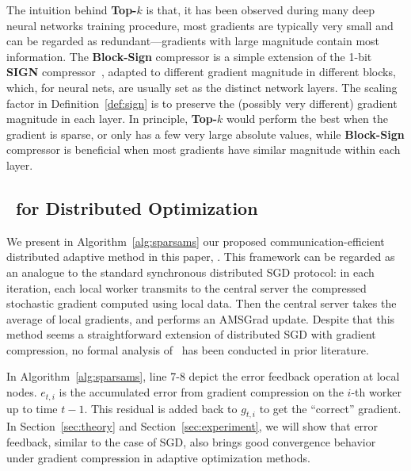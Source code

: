 \documentclass[11pt]{article}
\begin{document}
The intuition behind \textbf{Top-$k$} is that, it has been observed during many deep neural networks training procedure, most gradients are typically very small and can be regarded as redundant---gradients with large magnitude contain most information. The \textbf{Block-Sign} compressor is a simple extension of the 1-bit \textbf{SIGN} compressor~\cite{Proc:Seide14,bernstein2018signsgd}, adapted to different gradient magnitude in different blocks, which, for neural nets, are usually set as the distinct network layers. The scaling factor in Definition~\ref{def:sign} is to preserve the (possibly very different) gradient magnitude in each layer. In principle, \textbf{Top-$k$} would perform the best when the gradient is sparse, or only has a few very large absolute values, while \textbf{Block-Sign} compressor is beneficial when most gradients have similar magnitude within each layer.


\subsection{\algo\ for Distributed Optimization}


We present in Algorithm~\ref{alg:sparsams} our proposed communication-efficient distributed adaptive method in this paper, \algo. This framework can be regarded as an analogue to the standard synchronous distributed SGD protocol: in each iteration, each local worker transmits to the central server the compressed stochastic gradient computed using local data. Then the central server takes the average of local gradients, and performs an AMSGrad update. Despite that this method seems a straightforward extension of distributed SGD with gradient compression, no formal analysis of \algo\  has been conducted in prior literature.

In Algorithm~\ref{alg:sparsams}, line 7-8 depict the error feedback operation at local nodes. $e_{t,i}$ is the accumulated error from gradient compression on the $i$-th worker up to time $t-1$. This residual is added back to $g_{t,i}$ to get the ``correct'' gradient. In Section~\ref{sec:theory} and Section~\ref{sec:experiment}, we will show that error feedback, similar to the case of SGD, also brings good convergence behavior under gradient compression in adaptive optimization methods.
\end{document}
